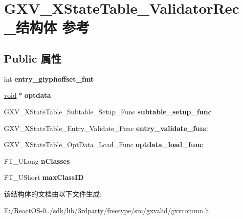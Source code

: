 \hypertarget{struct_g_x_v___x_state_table___validator_rec__}{}\section{G\+X\+V\+\_\+\+X\+State\+Table\+\_\+\+Validator\+Rec\+\_\+结构体 参考}
\label{struct_g_x_v___x_state_table___validator_rec__}
\subsection*{Public 属性}
\begin{DoxyCompactItemize}
\item 
\mbox{\label{struct_g_x_v___x_state_table___validator_rec___a570ee4abc64b4cabd741b9eb7547e933}} 
int {\bfseries entry\+\_\+glyphoffset\+\_\+fmt}
\item 
\mbox{\label{struct_g_x_v___x_state_table___validator_rec___ad6db975d9fd2b19800cfa9480dd06b1f}} 
\hyperlink{interfacevoid}{void} $\ast$ {\bfseries optdata}
\item 
\mbox{\label{struct_g_x_v___x_state_table___validator_rec___af7e77f7c958587819c315b5e6a83fed7}} 
G\+X\+V\+\_\+\+X\+State\+Table\+\_\+\+Subtable\+\_\+\+Setup\+\_\+\+Func {\bfseries subtable\+\_\+setup\+\_\+func}
\item 
\mbox{\label{struct_g_x_v___x_state_table___validator_rec___a6f79e1ba3f931ef3cd5dcd1fd8bf9e9c}} 
G\+X\+V\+\_\+\+X\+State\+Table\+\_\+\+Entry\+\_\+\+Validate\+\_\+\+Func {\bfseries entry\+\_\+validate\+\_\+func}
\item 
\mbox{\label{struct_g_x_v___x_state_table___validator_rec___a3ba537f78bdf6b491a4aac6f42f5e7e1}} 
G\+X\+V\+\_\+\+X\+State\+Table\+\_\+\+Opt\+Data\+\_\+\+Load\+\_\+\+Func {\bfseries optdata\+\_\+load\+\_\+func}
\item 
\mbox{\label{struct_g_x_v___x_state_table___validator_rec___a64d03b9f5e079c48632131a7b780404c}} 
F\+T\+\_\+\+U\+Long {\bfseries n\+Classes}
\item 
\mbox{\label{struct_g_x_v___x_state_table___validator_rec___a029df699295b0e2a0918b25579e03f4e}} 
F\+T\+\_\+\+U\+Short {\bfseries max\+Class\+ID}
\end{DoxyCompactItemize}


该结构体的文档由以下文件生成\+:\begin{DoxyCompactItemize}
\item 
E\+:/\+React\+O\+S-\/0../sdk/lib/3rdparty/freetype/src/gxvalid/gxvcommn.\+h\end{DoxyCompactItemize}
